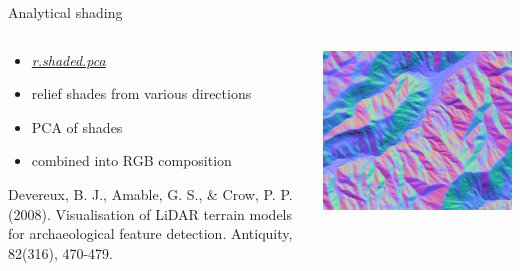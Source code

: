 \documentclass[xcolor={dvipsnames,usenames},beamer,aspectratio=169]{beamer}
\newcommand{\amodule}[1]{\href{http://grass.osgeo.org/grass70/manuals/addons/#1.html}{\emph{#1}}}
\begin{document}
\begin{frame}{Analytical shading}

\begin{columns}
\begin{column}{0.35\textwidth}

\begin{itemize}
  \item \amodule{r.shaded.pca}
  \item relief shades from various directions
  \item PCA of shades
  \item combined into RGB composition
\end{itemize}

\footnotesize
Devereux, B. J., Amable, G. S., \& Crow, P. P. (2008). Visualisation of LiDAR terrain models for archaeological feature detection. Antiquity, 82(316), 470-479.

\end{column}
\begin{column}{0.6\textwidth}

\begin{center}
  \includegraphics[width=\textwidth]{vis/pca_shade_road}
\end{center}

\end{column}
\end{columns}

\end{frame}
\end{document}
